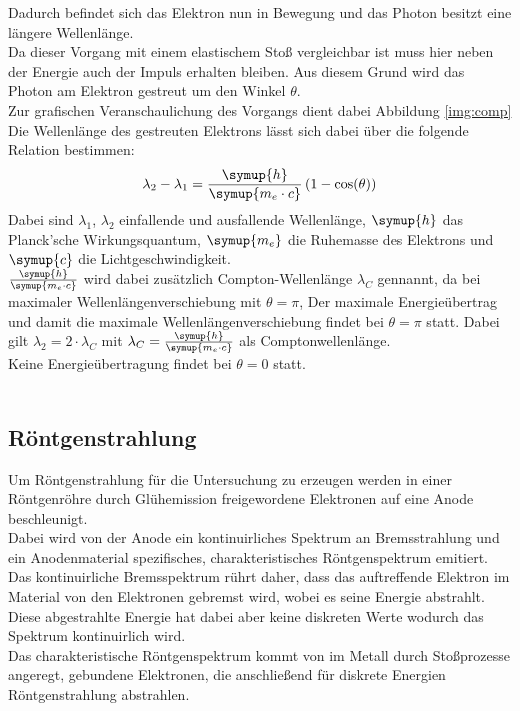 \noindent
Dadurch befindet sich das Elektron nun in Bewegung und das Photon besitzt eine längere Wellenlänge.\\
Da dieser Vorgang mit einem elastischem Stoß vergleichbar ist muss hier neben der Energie auch der Impuls erhalten bleiben.
Aus diesem Grund wird das Photon am Elektron gestreut um den Winkel $\theta$.\\
Zur grafischen Veranschaulichung des Vorgangs dient dabei Abbildung \ref{img:comp}\\
Die Wellenlänge des gestreuten Elektrons lässt sich dabei über die folgende Relation bestimmen:
\begin{equation*}
    \lambda_2-\lambda_1=\frac{\symup{h}}{\symup{m_e\cdot c}}\left(1-\cos(\theta)\right)
\end{equation*}
Dabei sind $\lambda_1$, $\lambda_2$ einfallende und ausfallende Wellenlänge, ${\symup{h}}$ das Planck'sche Wirkungsquantum\cite{Planck},
$\symup{m_e}$ die Ruhemasse des Elektrons\cite{me} und $\symup{ c}$ die Lichtgeschwindigkeit\cite{c}.\\
$\frac{\symup{h}}{\symup{m_e\cdot c}}$ wird dabei zusätzlich Compton-Wellenlänge $\lambda_C$ gennannt, 
da bei maximaler Wellenlängenverschiebung mit $\theta=\pi$, 
Der maximale Energieübertrag und damit die maximale Wellenlängenverschiebung findet bei $\theta=\pi$ statt. 
Dabei gilt $\lambda_2=2\cdot \lambda_C$ mit $\lambda_C=\frac{\symup{h}}{\symup{m_e\cdot c}}$ als Comptonwellenlänge.\\
Keine Energieübertragung findet bei $\theta=0$ statt.\\\\


\subsection{Röntgenstrahlung}

Um Röntgenstrahlung für die Untersuchung zu erzeugen werden in einer Röntgenröhre durch Glühemission freigewordene Elektronen auf eine Anode beschleunigt.\\
Dabei wird von der Anode ein kontinuirliches Spektrum an Bremsstrahlung und ein Anodenmaterial spezifisches, charakteristisches Röntgenspektrum emitiert.\\
Das kontinuirliche Bremsspektrum rührt daher, dass das auftreffende Elektron im Material von den Elektronen gebremst wird, wobei es seine Energie abstrahlt.
Diese abgestrahlte Energie hat dabei aber keine diskreten Werte wodurch das Spektrum kontinuirlich wird.\\
Das charakteristische Röntgenspektrum kommt von im Metall durch Stoßprozesse angeregt, gebundene Elektronen, die anschließend für diskrete Energien Röntgenstrahlung abstrahlen.\\\\

